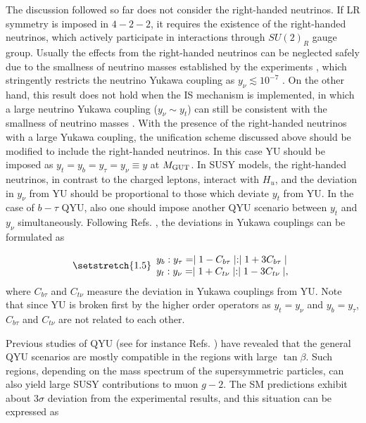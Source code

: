 \documentclass[12pt]{article}
\newcommand{\mgut}{M_{{\rm GUT}}}
\begin{document}
The discussion followed so far does not consider the right-handed neutrinos. If LR symmetry is imposed in $4-2-2$, it requires the existence of the right-handed neutrinos, which actively participate in interactions through $SU(2)_{R}$ gauge group. Usually the effects from the right-handed neutrinos can be neglected safely due to the smallness of neutrino masses established by the experiments \cite{Wendell:2010md}, which stringently restricts the neutrino Yukawa coupling as $y_{\nu}\lesssim 10^{-7}$ \cite{Coriano:2014wxa}. On the other hand, this result does not hold when the IS mechanism is implemented, in which a large neutrino Yukawa coupling ($y_{\nu}\sim y_{t}$) can still be consistent with the smallness of neutrino masses \cite{Khalil:2010iu}.  With the presence of the right-handed neutrinos with a large Yukawa coupling, the unification scheme discussed above should be modified to include the right-handed neutrinos. In this case YU should be imposed as $y_{t}=y_{b}=y_{\tau}=y_{\nu} \equiv y$ at $\mgut$. In SUSY models, the right-handed neutrinos, in contrast to the charged leptons, interact with $H_{u}$, and the deviation in $y_{\nu}$ from YU should be proportional to those which deviate $y_{t}$ from YU. In the case of $b-\tau$ QYU, also one should impose another QYU scenario between $y_{t}$ and $y_{\nu}$ simultaneously. Following Refs. \cite{Gomez:2002tj,Dar:2011sj}, the deviations in Yukawa couplings can be formulated as 

\begin{equation}
\setstretch{1.5}
\begin{array}{l}
y_{b}:y_{\tau}=\mid 1- C_{b\tau} \mid:\mid 1+3C_{b\tau}\mid \\ 
y_{t}:y_{\nu}=\mid 1+C_{t\nu}\mid:\mid 1- 3C_{t\nu}\mid,
\label{QYUCondition}
\end{array}
\end{equation}
where $C_{b \tau}$ and $C_{t \nu}$ measure the deviation in Yukawa couplings from YU. Note that  since YU is broken first by the higher order operators as $y_{t}=y_{\nu}$ and $y_{b}=y_{\tau}$, $C_{b \tau}$ and $C_{t \nu}$ are not related to each other.

Previous studies of QYU (see for instance Refs. \cite{Gomez:2002tj,Dar:2011sj}) have revealed that the general QYU scenarios are mostly compatible in the regions with large $\tan\beta$. Such regions, depending on the mass spectrum of the supersymmetric particles, can also yield large SUSY contributions to muon $g-2$. The SM predictions exhibit about $3\sigma$ deviation from the experimental results, and this situation can be expressed as \cite{Bennett:2006fi}
\end{document}
